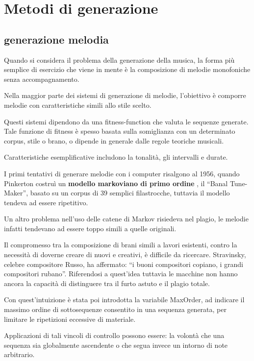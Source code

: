 \documentclass[a4paper,12pt]{report}
\begin{document}
\chapter{Metodi di generazione}

\section{generazione melodia}

Quando si considera il problema della generazione della musica, la forma più semplice di esercizio che viene in mente è la composizione di melodie monofoniche senza accompagnamento.

Nella maggior parte dei sistemi di generazione di melodie, l'obiettivo è comporre melodie con caratteristiche simili allo stile scelto.

Questi sistemi dipendono da una fitness-function che valuta le sequenze generate.
Tale funzione di fitness è spesso basata sulla somiglianza con un determinato corpus, stile o brano, o dipende in generale dalle regole teoriche musicali.

Caratteristiche esemplificative includono la tonalità, gli intervalli e durate.

I primi tentativi di generare melodie con i computer risalgono al 1956, quando Pinkerton costruì un \textbf{modello markoviano di primo ordine} , il “Banal Tune-Maker”, basato su un corpus di 39 semplici filastrocche,
tuttavia il modello tendeva ad essere ripetitivo.

Un altro problema nell'uso delle catene di Markov risiedeva nel plagio, le melodie infatti tendevano ad essere toppo simili a quelle originali.

Il compromesso tra la composizione di brani simili a lavori esistenti, contro la necessità di doverne creare di nuovi e creativi, è difficile da ricercare. 
Stravinsky, celebre compositore Russo, ha affermato: “i buoni compositori copiano, i grandi compositori rubano”.
Riferendosi a quest'idea tuttavia le macchine non hanno ancora la capacità di distinguere tra il furto astuto e il plagio totale.

Con quest'intuizione è stata poi introdotta la variabile MaxOrder, ad indicare il massimo ordine di sottosequenze consentito in una sequenza generata, per limitare le ripetizioni eccessive di materiale.

Applicazioni di tali vincoli di controllo possono essere: la volontà che una sequenza sia globalmente ascendente o che segua invece un intorno di note arbitrario.
\end{document}
